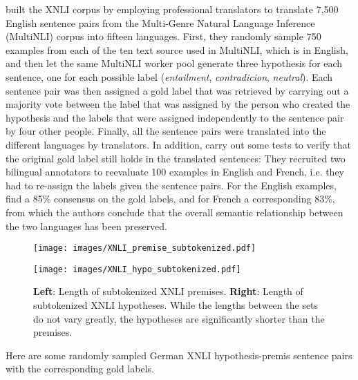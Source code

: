 \cite{conneau2018xnli} built the XNLI corpus by employing professional translators to translate
7,500 English sentence pairs from the Multi-Genre Natural Language Inference (MultiNLI) corpus
\cite{williams2017broad} into fifteen languages. First, they randomly sample 750 examples from each
of the ten text source used in MultiNLI, which is in English, and then let the same MultiNLI worker
pool generate three hypothesis for each sentence, one for each possible label (\emph{entailment},
\emph{contradicion}, \emph{neutral}). Each sentence pair was then assigned a gold label that was
retrieved by carrying out a majority vote between the label that was assigned by the person who
created the hypothesis and the labels that were assigned independently to the sentence pair by
four other people. Finally, all the sentence pairs were translated into the different languages by
translators. In addition, \cite{conneau2018xnli} carry out some tests to verify that the original
gold label still holds in the translated sentences: They recruited two bilingual annotators to
reevaluate 100 examples in English and French, i.e. they had to re-assign the labels given the
sentence pairs. For the English examples, \citeauthor{conneau2018xnli} find a 85\% consensus on the
gold labels, and for French a corresponding 83\%, from which the authors conclude that the overall
semantic relationship between the two languages has been preserved.

\begin{figure}
  \begin{minipage}{0.45\linewidth}
  \vspace{0pt}
    \texttt{[image: images/XNLI\_premise\_subtokenized.pdf]}
  \end{minipage}
  \hfill
  \begin{minipage}{0.45\linewidth}
  \vspace{0pt}
    \texttt{[image: images/XNLI\_hypo\_subtokenized.pdf]}
  \end{minipage}
  \caption[XNLI Lengths]{\textbf{Left}: Length of subtokenized XNLI premises. \textbf{Right}:
    Length of subtokenized XNLI hypotheses. While the lengths between the sets do not vary greatly,
    the hypotheses are significantly shorter than the premises.}
  \label{fig:xnli-subtokenized}
\end{figure}

Here are some randomly sampled German XNLI hypothesis-premis sentence pairs with the
corresponding gold labels.

